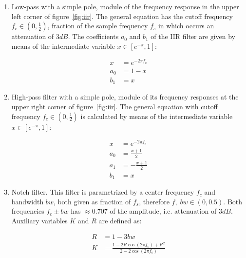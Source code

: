 \documentclass[
 aip,
 jmp,
 amsmath,amssymb,
 reprint,
]{revtex4-1}
\begin{document}
\begin{enumerate}
  \item Low-pass with a simple pole, module of the frequency response in the upper left corner of figure~\ref{fig:iir}. The general equation has the cutoff frequency $f_c \in (0,\frac{1}{2})$, fraction of the sample frequency $f_s$ in which occurs an attenuation of $3dB$.
  The coefficients $a_0$ and $b_1$ of the IIR filter are given by means of the intermediate variable $x \in [e^{-\pi},1]$:

\begin{equation}\label{eq:passa-baixas}
 \begin{split}
 x & =e^{-2\pi f_c} \\
 a_0 & =  1-x \\
 b_1 & =  x
 \end{split}
\end{equation}

  \item High-pass filter with a simple pole,  module of its frequency responses at the upper right corner of figure~\ref{fig:iir}. The general equation with cutoff frequency $f_c \in (0,\frac{1}{2})$ is calculated by means of the intermediate variable $x \in [e^{-\pi},1]$:

\begin{equation}\label{eq:passa-altas}
 \begin{split}
 x & =e^{-2\pi f_c} \\
 a_0 & =  \frac{x+1}{2} \\
 a_1 & =  -\frac{x+1}{2} \\
 b_1 & =  x
 \end{split}
\end{equation}


\item Notch filter. This filter is parametrized by a center frequency $f_c$ and bandwidth $bw$, both given as fraction of $f_s$, therefore $f,\; bw \in (0,0.5)$. Both frequencies $f_c \pm bw$ has $\approx 0.707$ of the amplitude, i.e. attenuation of $3dB$.
Auxiliary variables $K$ and $R$ are defined as:

\begin{equation}\label{eq:varAux}
 \begin{split}
  R & = 1 - 3bw \\
  K & = \frac{1-2R\cos(2\pi f_c) + R^2}{2 - 2 \cos (2 \pi f_c)}
 \end{split}
\end{equation}


\end{enumerate}
\end{document}
